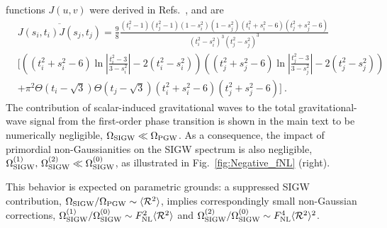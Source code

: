 \documentclass[twocolumn,superscriptaddress,aps,preprintnumbers,amsmath,amssymb,prl,footinbib]{revtex4-2}
\begin{document}
functions $J(u,v)$ were derived in Refs.~\cite{Espinosa:2018eve,Kohri:2018awv,Atal:2021jyo,Adshead:2021hnm,Li:2023qua}, and are \begin{align}\label{eq:J-ave-12} & \overline{ J (s_i,t_i)J (s_j,t_j) } = \frac{9}{8}\frac{\left(t_i^2-1\right) \left(t_j^2-1\right) \left(1-s_i^2\right) \left(1-s_j^2\right) \left(t_i^2+s_i^2-6\right) \left(t_j^2+s_j^2-6\right) }{\left(t_i^2-s_i^2\right)^3 \left(t_j^2-s_j^2\right)^3} \nonumber\\ & \Bigg[ \left( \left(t_i^2+s_i^2-6\right) \ln \left| \frac{t_i^2-3}{3-s_i^2}\right| - 2\left(t_i^2-s_i^2\right) \right) \left( \left(t_j^2+s_j^2-6\right) \ln \left| \frac{t_j^2-3}{3-s_j^2}\right| - 2\left(t_j^2-s_j^2\right) \right) \nonumber\\ & + \pi^2\Theta\left(t_i-\sqrt{3}\right) \Theta\left(t_j-\sqrt{3}\right) \left(t_i^2+s_i^2-6\right) \left(t_j^2+s_j^2-6\right) \Bigg]\ . \end{align}
The contribution of scalar-induced gravitational waves to the total gravitational-wave signal from the first-order phase transition is shown in the main text to be numerically negligible,
$\Omega_{\rm SIGW} \ll \Omega_{\rm PGW}$.
As a consequence, the impact of primordial non-Gaussianities on the SIGW spectrum is also negligible,
$\Omega_{\rm SIGW}^{(1)},\,\Omega_{\rm SIGW}^{(2)} \ll \Omega_{\rm SIGW}^{(0)}$,
as illustrated in Fig.~\ref{fig:Negative_fNL} (right).

This behavior is expected on parametric grounds:
a suppressed SIGW contribution,
$\Omega_{\rm SIGW}/\Omega_{\rm PGW}\sim \langle \mathcal{R}^2\rangle$,
implies correspondingly small non-Gaussian corrections,
$\Omega_{\rm SIGW}^{(1)}/\Omega_{\rm SIGW}^{(0)}\sim F_{\rm NL}^2\langle \mathcal{R}^2\rangle$
and
$\Omega_{\rm SIGW}^{(2)}/\Omega_{\rm SIGW}^{(0)}\sim F_{\rm NL}^4\langle \mathcal{R}^2\rangle^2$.






\end{document}
